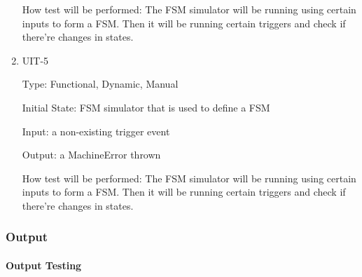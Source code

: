 \documentclass[12pt, titlepage]{article}
\begin{document}
\begin{enumerate}
How test will be performed: The FSM simulator will be running using certain inputs to form a FSM. Then it will be 
running certain triggers and check if there're changes in states.


\item{UIT-5\\}

  Type: Functional, Dynamic, Manual
  
  Initial State: FSM simulator that is used to define a FSM
  
  Input: a non-existing trigger event
  
  Output: a MachineError thrown
  
  How test will be performed: The FSM simulator will be running using certain inputs to form a FSM. Then it will be 
  running certain triggers and check if there're changes in states.

\end{enumerate}

\subsubsection{Output}
		
\paragraph{Output Testing}
\end{document}
